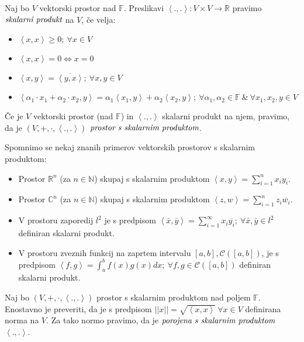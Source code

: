 \documentclass[mat2]{matdelo}
\newcommand{\R}{\mathbb{R}}
\newcommand{\F}{\mathbb{F}}
\newcommand{\N}{\mathbb{N}}
\newcommand{\C}{\mathbb{C}}
\newcommand{\abs}[1]{\ensuremath{\lvert #1 \rvert}}
\newcommand{\norm}[1]{\abs{\abs{#1}}}
\newcommand{\pojem}[1]{\ensuremath{\emph{#1}}}
\newcommand{\Sp}[2]{\ensuremath{\left<#1, #2\right>}}
\newcommand{\map}[3]{\ensuremath{{#1}:{#2}\rightarrow{#3}}}
\begin{document}
		\begin{definicija}
			\label{def:ScalProd}
			Naj bo $V$ vektorski prostor nad $\F$. Preslikavi $\map{\Sp{.}{.}}{V\times V}{\R}$ pravimo \pojem{skalarni produkt} na $V$, če velja: \begin{itemize}
				\item $\Sp{x}{x} \geq 0;~\forall x\in V$
				\item $\Sp{x}{x} = 0 \iff x = 0$
				\item $\Sp{x}{y} = \overline{\Sp{y}{x}};~\forall x, y\in V$
				\item $\Sp{\alpha_1\cdot x_1 + \alpha_2\cdot x_2}{y} = \alpha_1\Sp{x_1}{y} +\alpha_2\Sp{x_2}{y};~\forall \alpha_1, \alpha_2\in\F~\&~\forall x_1, x_2, y\in V$
			\end{itemize}
			Če je $V$ vektorski prostor (nad $\F$) in $\Sp{.}{.}$ skalarni produkt na njem, pravimo, da je $(V, +, \cdot, \Sp{.}{.})$ \pojem{prostor s skalarnim produktom}.
		\end{definicija}
		
		\begin{primer}
			\label{prim:ScalProd}
			Spomnimo se nekaj znanih primerov vektorskih prostorov s skalarnim produktom: \begin{itemize}
				\item Prostor $\R^n$ (za $n\in\N$) skupaj s skalarnim produktom $\Sp{x}{y} = \sum_{i = 1}^{n}x_iy_i$.
				\item Prostor $\C^n$ (za $n\in\N$) skupaj s skalarnim produktom $\Sp{z}{w} = \sum_{i = 1}^{n}z_i\overline{w_i}$.
				\item V prostoru zaporedij $l^2$ je s predpisom $\Sp{\bar{x}}{\bar{y}} = \sum_{i = 1}^{\infty}x_i\overline{y_i};~\forall \bar{x}, \bar{y}\in l^2$ definiran skalarni produkt.
				\item V prostoru zveznih funkcij na zaprtem intervalu $[a, b], \mathcal{C}([a, b])$, je s predpisom $\Sp{f}{g} = \int_{a}^{b}f(x)g(x)dx;~\forall f, g \in \mathcal{C}([a, b])$ definiran skalarni produkt.
			\end{itemize}
		\end{primer}
		
		\begin{opomba}
			\label{op:ScalProd}
			Naj bo $(V, +, \cdot, \Sp{.}{.})$ prostor s skalarnim produktom nad poljem $\F$. Enostavno je preveriti, da je s predpisom $\norm{x} = \sqrt{\Sp{x}{x}}~\forall x\in V$ definirana norma na $V$. Za tako normo pravimo, da je \pojem{porojena s skalarnim produktom} $\Sp{.}{.}$.
		\end{opomba}
		
\end{document}
